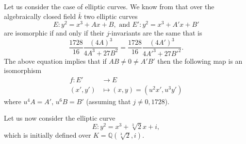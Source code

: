 \documentclass[10pt]{amsart}
\theoremstyle{definition}
\begin{document}
Let us consider the case of elliptic curves. We know from \cite[III.1]{MR2514094} that over the algebraically closed field $\bar{k}$ two elliptic curves 
\[
  E:y^2 =x^3+ Ax+ B, \text{ and } E':y^2= x^3 + A'x +B'
\]
are isomorphic if and only if their $j$-invariants are the same that is
\[
  \frac{1728}{16} \frac{ (4A)^3}{4A^3+27 B^2} =  \frac{1728}{16}\frac{ (4A')^3}{4A'^3+27 B'^2}.
\]
The above equation implies that if $AB\neq 0 \neq A' B'$ then the  following map is an isomorphism 
\begin{align*}
f \colon E' & \longrightarrow E \\
(x',y') & \longmapsto (x,y)=(u^2x', u^3 y')
\end{align*}
where $u^4 A=A'$, $u^6 B=B'$ (assuming that $j \neq 0, 1728$).

Let us now consider the elliptic curve  
\[
  E: y^2 = x^3 + \sqrt[3]{2} x + i,
\]
which is initially defined over $K=\mathbb{Q}(\sqrt[3]2,i)$. 
\end{document}
